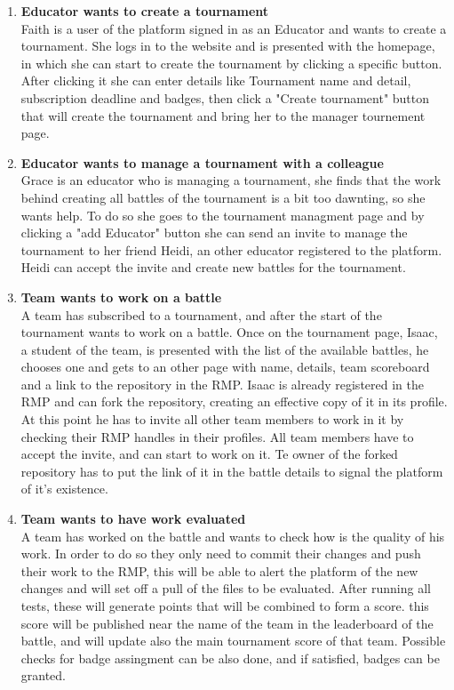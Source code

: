 \begin{enumerate}[label=$\bullet$ \textbf{SC\arabic*:}]
    \item \textbf{Educator wants to create a tournament}\\ Faith is a user of the platform signed in as an Educator and wants to create a tournament. She logs in to the website and is presented with the homepage, in which she can start to create the tournament by clicking a specific button. After clicking it she can enter details like Tournament name and detail, subscription deadline and badges, then click a "Create tournament" button that will create the tournament and bring her to the manager tournement page. 
    \item \textbf{Educator wants to manage a tournament with a colleague}\\ Grace is an educator who is managing a tournament, she finds that the work behind creating all battles of the tournament is a bit too dawnting, so she wants help. To do so she goes to the tournament managment page and by clicking a "add Educator" button she can send an invite to manage the tournament to her friend Heidi, an other educator registered to the platform. Heidi can accept the invite and create new battles for the tournament.
    \item \textbf{Team wants to work on a battle}\\ A team has subscribed to a tournament, and after the start of the tournament wants to work on a battle. Once on the tournament page, Isaac, a student of the team, is presented with the list of the available battles, he chooses one and gets to an other page with name, details, team scoreboard and a link to the repository in the RMP. Isaac is already registered in the RMP and can fork the repository, creating an effective copy of it in its profile. At this point he has to invite all other team members to work in it by checking their RMP handles in their profiles. All team members have to accept the invite, and can start to work on it. Te owner of the forked repository has to put the link of it in the battle details to signal the platform of it's existence.
    \item \textbf{Team wants to have work evaluated}\\ A team has worked on the battle and wants to check how is the quality of his work. In order to do so they only need to commit their changes and push their work to the RMP, this will be able to alert the platform of the new changes and will set off a pull of the files to be evaluated. After running all tests, these will generate points that will be combined to form a score. this score will be published near the name of the team in the leaderboard of the battle, and will update also the main tournament score of that team. Possible checks for badge assingment can be also done, and if satisfied, badges can be granted.

\end{enumerate}
